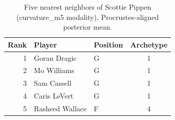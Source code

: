 \begin{table}[htbp]
  \centering\small
  \begin{tabular}{rllc}
    \toprule
    Rank & Player & Position & Archetype \\
    \midrule
    1 & Goran Dragic & G & 1 \\
    2 & Mo Williams & G & 1 \\
    3 & Sam Cassell & G & 1 \\
    4 & Caris LeVert & G & 1 \\
    5 & Rasheed Wallace & F & 4 \\
    \bottomrule
  \end{tabular}
  \caption{Five nearest neighbors of Scottie Pippen (curvature_m5 modality), Procrustes-aligned posterior mean.}
  \label{tab:Scottie_Pippen_neighbors_curvature_m5}
\end{table}

